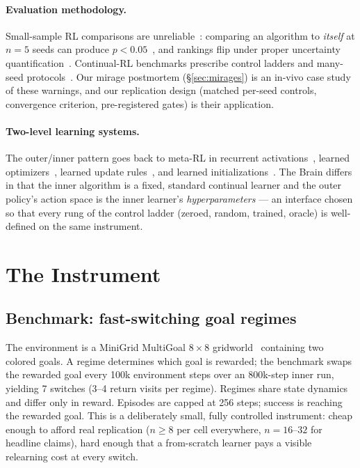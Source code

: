 \documentclass[11pt]{article}
\begin{document}
\paragraph{Evaluation methodology.}
Small-sample RL comparisons are unreliable~\citep{henderson2018matters}:
comparing an algorithm to \emph{itself} at $n{=}5$ seeds can produce
$p<0.05$~\citep{colas2018seeds}, and rankings flip under proper uncertainty
quantification~\citep{agarwal2021precipice}. Continual-RL benchmarks
prescribe control ladders and many-seed
protocols~\citep{wolczyk2021continualworld,powers2022cora,yu2019metaworld}.
Our mirage postmortem (\S\ref{sec:mirages}) is an in-vivo case study of these
warnings, and our replication design (matched per-seed controls, convergence
criterion, pre-registered gates) is their application.

\paragraph{Two-level learning systems.}
The outer/inner pattern goes back to meta-RL in recurrent
activations~\citep{duan2016rl2,wang2016l2rl}, learned
optimizers~\citep{andrychowicz2016l2l}, learned update
rules~\citep{oh2020lpg,goldie2025howmeta}, and learned
initializations~\citep{finn2017maml}. The Brain differs in that the inner
algorithm is a fixed, standard continual learner and the outer policy's action
space is the inner learner's \emph{hyperparameters} --- an interface chosen so
that every rung of the control ladder (zeroed, random, trained, oracle) is
well-defined on the same instrument.

\section{The Instrument}
\label{sec:instrument}

\subsection{Benchmark: fast-switching goal regimes}
The environment is a MiniGrid MultiGoal $8{\times}8$
gridworld~\citep{chevalierboisvert2023minigrid} containing two colored goals.
A regime determines which goal is rewarded; the benchmark swaps the rewarded
goal every 100k environment steps over an 800k-step inner run, yielding 7
switches (3--4 return visits per regime). Regimes share state dynamics and
differ only in reward. Episodes are capped at 256 steps; success is reaching
the rewarded goal. This is a deliberately small, fully controlled instrument:
cheap enough to afford real replication ($n{\geq}8$ per cell everywhere,
$n{=}16$--$32$ for headline claims), hard enough that a from-scratch learner
pays a visible relearning cost at every switch.
\end{document}
